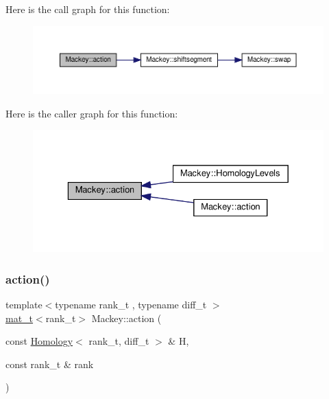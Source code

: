 Here is the call graph for this function\+:\nopagebreak
\begin{figure}[H]
\begin{center}
\leavevmode
\includegraphics[width=350pt]{namespaceMackey_aa515b26c0fbc7f19b36cee7d826f07b9_cgraph}
\end{center}
\end{figure}
Here is the caller graph for this function\+:\nopagebreak
\begin{figure}[H]
\begin{center}
\leavevmode
\includegraphics[width=329pt]{namespaceMackey_aa515b26c0fbc7f19b36cee7d826f07b9_icgraph}
\end{center}
\end{figure}
\mbox{\label{namespaceMackey_aaa66c9857ba86a13949d1b1825ea20f7}} 
\subsubsection{\texorpdfstring{action()}{action()}\hspace{0.1cm}{\footnotesize\ttfamily [2/2]}}
{\footnotesize\ttfamily template$<$typename rank\+\_\+t , typename diff\+\_\+t $>$ \\
\hyperlink{namespaceMackey_a035386035757dade630f685e508e5cf9}{mat\+\_\+t}$<$rank\+\_\+t$>$ Mackey\+::action (\begin{DoxyParamCaption}\item[{const \hyperlink{classMackey_1_1Homology}{Homology}$<$ rank\+\_\+t, diff\+\_\+t $>$ \&}]{H,  }\item[{const rank\+\_\+t \&}]{rank }\end{DoxyParamCaption})}



